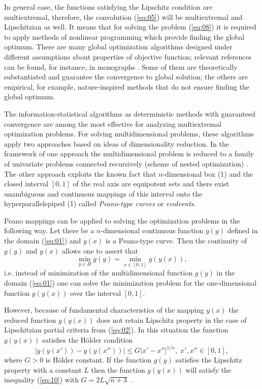 \documentclass[runningheads]{llncs}
\begin{document}
In general case, the functions satisfying the Lipschitz condition are multiextremal, therefore, the convolution (\ref{eq:05}) will be multiextremal and Lipschitzian as well. It means that for solving the problem (\ref{eq:08}) it is required to apply methods of nonlinear programming which provide finding the global optimum. There are many global optimization algorithms designed under different assumptions about properties of objective function; relevant references can be found, for instance, in monographs \cite{Pardalos2017,Marler2009,Sergeyev2013}. Some of them are theoretically substantiated and guarantee the convergence to global solution; the others are empirical, for example, nature-inspired methods that do not ensure finding the global optimum. 

The information-statistical algorithms \cite{Gergel2018,Barkalov2018,Strongin2003}  as deterministic methods with guaranteed convergence are among the most effective for analyzing multiextremal optimization problems. For solving multidimensional problems, these algorithms apply two approaches based on ideas of dimensionality reduction. In the framework of one approach the multidimensional problem is reduced to a family of univariate problems connected recursively (scheme of nested optimization) \cite{Gergel2019_2}. The other approach \cite{Gergel2018,Sergeyev2013} exploits the known fact that $n$-dimensional box (1) and the closed interval $[0,1]$ of the real axis are equipotent sets and there exist unambiguous and continuous mappings of this interval onto the hyperparallelepiped (1) called \textit{Peano-type curves} or \textit{evolvents}.

Peano mappings can be applied to solving the optimization problems in the following way. Let there be a $n$-dimensional continuous function $g(y)$ defined in the domain (\ref{eq:01}) and $y(x)$ is a Peano-type curve. Then the continuity of $g(y)$ and $y(x)$ allows one to assert that
\begin{equation}
    \min_{y\in H} g(y) = \min_{x\in[0,1]} g(y(x)),
\end{equation}
i.e. instead of minimization of the multidimensional function $g(y)$ in the domain (\ref{eq:01}) one can solve the minimization problem for the one-dimensional function $g(y(x))$ over the interval $[0,1]$.

However, because of fundamental characteristics of the mapping $y(x)$ the reduced function $g(y(x))$ does not retain Lipschitz property in the case of Lipschitzian partial criteria from (\ref{eq:02}). In this situation the function $g(y(x))$ satisfies the H{\" o}lder condition 
\begin{equation}
    \label{eq:10}
    |g(y(x')) - g(y(x''))| \leq G \left|x'-x''\right|^{1/n}, \; x', x'' \in [0,1],
\end{equation}
where $G>0$ is H{\" o}lder constant. If the function $g(y)$ satisfies the Lipschitz property with a constant $L$ then the function $g(y(x))$ will satisfy the inequality (\ref{eq:10}) with $G=2L\sqrt{n+3}$ \cite{Strongin2003,Sergeyev2013}.
\end{document}
